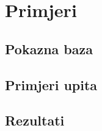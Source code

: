 \section{Primjeri}

\subsection{Pokazna baza} \label{subsec:pokazna}

\subsection{Primjeri upita} \label{subsec:primjer}

\subsection{Rezultati} \label{subsec:rezultati}
